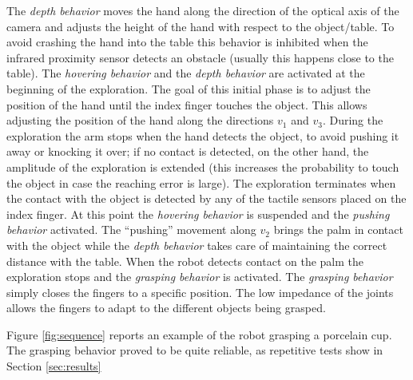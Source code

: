 The \emph{depth behavior} moves the hand along the direction of
the optical axis of the camera and adjusts the height of the hand
with respect to the object/table. To avoid crashing the hand into
the table this behavior is inhibited when the infrared proximity
sensor detects an obstacle (usually this happens close to the
table).
The \emph{hovering behavior} and the \emph{depth behavior} are
activated at the beginning of the exploration. The goal of this
initial phase is to adjust the position of the hand until the
index finger touches the object. This allows adjusting the
position of the hand along the directions $v_1$ and $v_3$. During
the exploration the arm stops when the hand detects the object, to
avoid pushing it away or knocking it over; if no contact is
detected, on the other hand, the amplitude of the exploration is
extended (this increases the probability to touch the object in
case the reaching error is large). The exploration terminates when
the contact with the object is detected by any of the tactile
sensors placed on the index finger. At this point the \emph{hovering
behavior} is suspended and the \emph{pushing behavior} activated. The
``pushing'' movement along $v_2$ brings the palm in contact with
the object while the \emph{depth behavior} takes care of
maintaining the correct distance with the table. When the robot
detects contact on the palm the exploration stops and the
\emph{grasping behavior} is activated. The \emph{grasping
behavior} simply closes the fingers to a specific position. The
low impedance of the joints allows the fingers to adapt to the
different objects being grasped.

Figure \ref{fig:sequence} reports an example of the robot grasping 
a porcelain cup. The grasping behavior proved to be quite reliable, as 
repetitive tests show in Section \ref{sec:results}